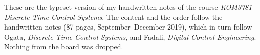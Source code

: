 These are the typeset version of my handwritten notes of the course
\emph{KOM3781 Discrete-Time Control Systems}. The content and the order follow the handwritten
notes (87 pages, September--December 2019), which in turn follow Ogata,
\emph{Discrete-Time Control Systems}, and Fadali, \emph{Digital Control Engineering}.
Nothing from the board was dropped.
